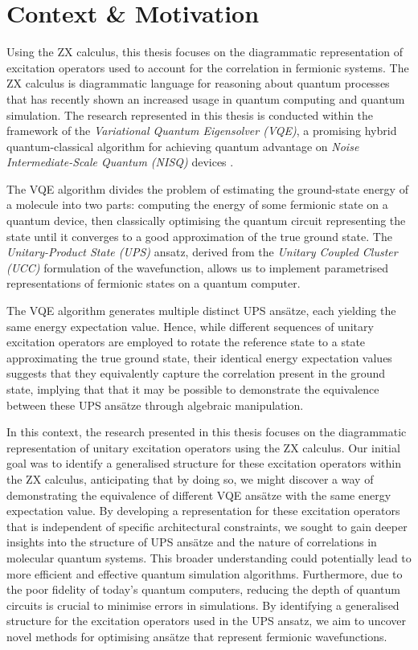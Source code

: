 \section{Context \& Motivation}%
\label{context-motivation}

Using the ZX calculus, this thesis focuses on the diagrammatic representation of excitation operators used to account for the correlation in fermionic systems. The ZX calculus is diagrammatic language for reasoning about quantum processes \cite{Coecke2011} that has recently shown an increased usage in quantum computing and quantum simulation. The research represented in this thesis is conducted within the framework of the \textit{Variational Quantum Eigensolver (VQE)}, a promising hybrid quantum-classical algorithm for achieving quantum advantage on \textit{Noise Intermediate-Scale Quantum (NISQ)} devices \cite{Cerezo2020}.

The VQE algorithm divides the problem of estimating the ground-state energy of a molecule into two parts: computing the energy of some fermionic state on a quantum device, then classically optimising the quantum circuit representing the state until it converges to a good approximation of the true ground state. The \textit{Unitary-Product State (UPS)} ansatz, derived from the \textit{Unitary Coupled Cluster (UCC)} formulation of the wavefunction, allows us to implement parametrised representations of fermionic states on a quantum computer.

The VQE algorithm generates multiple distinct UPS ansätze, each yielding the same energy expectation value. Hence, while different sequences of unitary excitation operators are employed to rotate the reference state to a state approximating the true ground state, their identical energy expectation values suggests that they equivalently capture the correlation present in the ground state, implying that that it may be possible to demonstrate the equivalence between these UPS ansätze through algebraic manipulation.

In this context, the research presented in this thesis focuses on the diagrammatic representation of unitary excitation operators using the ZX calculus. Our initial goal was to identify a generalised structure for these excitation operators within the ZX calculus, anticipating that by doing so, we might discover a way of demonstrating the equivalence of different VQE ansätze with the same energy expectation value. By developing a representation for these excitation operators that is independent of specific architectural constraints, we sought to gain deeper insights into the structure of UPS ansätze and the nature of correlations in molecular quantum systems. This broader understanding could potentially lead to more efficient and effective quantum simulation algorithms. Furthermore, due to the poor fidelity of today's quantum computers, reducing the depth of quantum circuits is crucial to minimise errors in simulations. By identifying a generalised structure for the excitation operators used in the UPS ansatz, we aim to uncover novel methods for optimising ansätze that represent fermionic wavefunctions.

